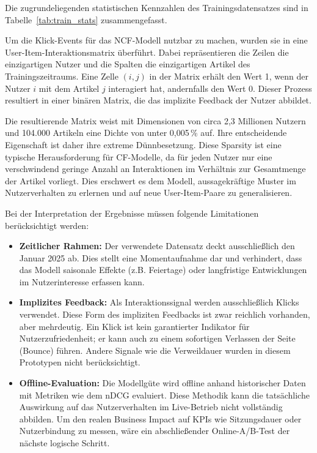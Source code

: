 

Die zugrundeliegenden statistischen Kennzahlen des Trainingsdatensatzes sind in Tabelle~\ref{tab:train_stats} zusammengefasst.


\label{tab:train_stats}

Um die Klick-Events für das \ac{NCF}-Modell nutzbar zu machen, wurden sie in eine User-Item-Interaktionsmatrix überführt. 
Dabei repräsentieren die Zeilen die einzigartigen Nutzer und die Spalten die einzigartigen Artikel des Trainingszeitraums. 
Eine Zelle $(i, j)$ in der Matrix erhält den Wert 1, wenn der Nutzer $i$ mit dem Artikel $j$ interagiert hat, andernfalls den Wert 0. 
Dieser Prozess resultiert in einer binären Matrix, die das implizite Feedback der Nutzer abbildet.

Die resultierende Matrix weist mit Dimensionen von circa 2,3 Millionen Nutzern und 104.000 Artikeln eine Dichte von unter 0,005\,\% auf. 
Ihre entscheidende Eigenschaft ist daher ihre extreme Dünnbesetzung. 
Diese Sparsity ist eine typische Herausforderung für \ac{CF}-Modelle, da für jeden Nutzer nur eine verschwindend geringe Anzahl an Interaktionen im Verhältnis zur Gesamtmenge der Artikel vorliegt. 
Dies erschwert es dem Modell, aussagekräftige Muster im Nutzerverhalten zu erlernen und auf neue User-Item-Paare zu generalisieren.

Bei der Interpretation der Ergebnisse müssen folgende Limitationen berücksichtigt werden:

\begin{itemize}
    \item \textbf{Zeitlicher Rahmen:} Der verwendete Datensatz deckt ausschließlich den Januar 2025 ab. 
    Dies stellt eine Momentaufnahme dar und verhindert, dass das Modell saisonale Effekte (z.B. Feiertage) oder langfristige Entwicklungen im Nutzerinteresse erfassen kann.

    \item \textbf{Implizites Feedback:} Als Interaktionssignal werden ausschließlich Klicks verwendet. 
    Diese Form des impliziten Feedbacks ist zwar reichlich vorhanden, aber mehrdeutig. 
    Ein Klick ist kein garantierter Indikator für Nutzerzufriedenheit; er kann auch zu einem sofortigen Verlassen der Seite (Bounce) führen. 
    Andere Signale wie die Verweildauer wurden in diesem Prototypen nicht berücksichtigt.

    \item \textbf{Offline-Evaluation:} Die Modellgüte wird offline anhand historischer Daten mit Metriken wie dem \ac{nDCG} evaluiert. 
    Diese Methodik kann die tatsächliche Auswirkung auf das Nutzerverhalten im Live-Betrieb nicht vollständig abbilden. 
    Um den realen Business Impact auf KPIs wie Sitzungsdauer oder Nutzerbindung zu messen, wäre ein abschließender Online-A/B-Test der nächste logische Schritt.
\end{itemize}
